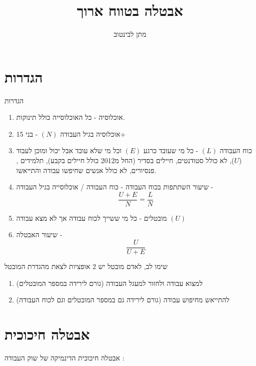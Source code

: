 \documentclass{beamer}
\title[]{אבטלה בטווח ארוך}
\author{מתן לבינטוב}
\institute[{{ אב"ג}}]{{ אוניברסיטת בן גוריון בנגב}}
\begin{document}
\begin{RTL}
\begin{frame}
\titlepage
\end{frame}
\begin{frame}
    \tableofcontents[sectionstyle=show,
    subsectionstyle=show/shaded/hide,
    subsubsectionstyle=show/shaded/hide]
\end{frame}

\section{הגדרות}
\begin{frame}[allowframebreaks]{הגדרות}
    \begin{enumerate}
        \item אוכלוסיה - כל האוכלוסייה כולל תינוקות.
        \item אוכלוסיה בגיל העבודה $(N)$ - בני 15+ 
        \item כוח העבודה $(L)$ - כל מי שעובד כרגע $(E)$ וכל מי שלא עובד אבל יכול ומוכן לעבוד ($U$), לא כולל סטודנטים, חיילים בסדיר (החל מ2012 כולל חיילים בקבע), תלמידים , פנסיורים, לא כולל אנשים שחיפשו עבודה והתייאשו.
        \item שיעור השתתפות בכוח העבודה - כוח העבודה / אוכלוסייה בגיל העבודה - $$\frac{U + E}{N} = \frac{L}{N}$$
        \item מובטלים - כל מי ששייך לכוח עבודה אך לא מצא עבודה $\left(U\right)$
        \item שיעור האבטלה - $$\frac{U}{U+E}$$
    \end{enumerate}
    
    \framebreak

    \begin{block}{שימו לב, לאדם מובטל יש 2 אופציות לצאת מהגדרת המובטל}
        \begin{enumerate}
            \item למצוא עבודה ולחזור למעגל העבודה (גורם לירידה במספר המובטלים)
            \item להתייאש מחיפוש עבודה (גורם לירידה גם במספר המובטלים וגם לכוח העבודה)
        \end{enumerate}
    \end{block}
\end{frame}
\section{אבטלה חיכוכית}
\begin{frame}[allowframebreaks]{אבטלה חיכוכית}
    הדינמיקה של שוק העבודה : 
    \begin{center}
        \begin{tikzpicture}[
            box/.style={rectangle, draw, minimum width=2.5cm, minimum height=1cm, fill=orange!30},
            myarrow/.style={-Stealth, thick, blue}
        ][H]
        

\end{tikzpicture}
\end{center}
\end{frame}
\end{RTL}
\end{document}

